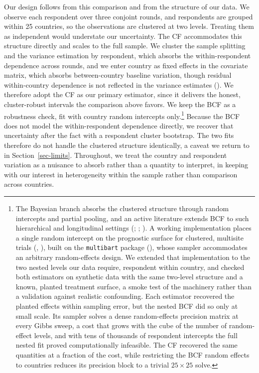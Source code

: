 \documentclass[
  10pt,
  a4paper,
  DIV=11,
  numbers=noendperiod]{scrartcl}
\begin{document}
Our design follows from this comparison and from the structure of our
data. We observe each respondent over three conjoint rounds, and
respondents are grouped within 25 countries, so the observations are
clustered at two levels. Treating them as independent would understate
our uncertainty. The CF accommodates this structure directly and scales
to the full sample. We cluster the sample splitting and the variance
estimation by respondent, which absorbs the within-respondent dependence
across rounds, and we enter country as fixed effects in the covariate
matrix, which absorbs between-country baseline variation, though
residual within-country dependence is not reflected in the variance
estimates (). We
therefore adopt the CF as our primary estimator, since it delivers the
honest, cluster-robust intervals the comparison above favors. We keep
the BCF as a robustness check, fit with country random intercepts
only.\footnote{The Bayesian branch absorbs the clustered structure
  through random intercepts and partial pooling, and an active
  literature extends BCF to such hierarchical and longitudinal settings
  (;
  ;
  ). A working
  implementation places a single random intercept on the prognostic
  surface for clustered, multisite trials
  (,
  ), built on the
  \texttt{multibart} package (), whose sampler accommodates an arbitrary random-effects design.
  We extended that implementation to the two nested levels our data
  require, respondent within country, and checked both estimators on
  synthetic data with the same two-level structure and a known, planted
  treatment surface, a smoke test of the machinery rather than a
  validation against realistic confounding. Each estimator recovered the
  planted effects within sampling error, but the nested BCF did so only
  at small scale. Its sampler solves a dense random-effects precision
  matrix at every Gibbs sweep, a cost that grows with the cube of the
  number of random-effect levels, and with tens of thousands of
  respondent intercepts the full nested fit proved computationally
  infeasible. The CF recovered the same quantities at a fraction of the
  cost, while restricting the BCF random effects to countries reduces
  its precision block to a trivial \(25 \times 25\) solve.} Because the
BCF does not model the within-respondent dependence directly, we recover
that uncertainty after the fact with a respondent cluster bootstrap. The
two fits therefore do not handle the clustered structure identically, a
caveat we return to in Section~\ref{sec-limits}. Throughout, we treat
the country and respondent variation as a nuisance to absorb rather than
a quantity to interpret, in keeping with our interest in heterogeneity
within the sample rather than comparison across countries.
\end{document}
